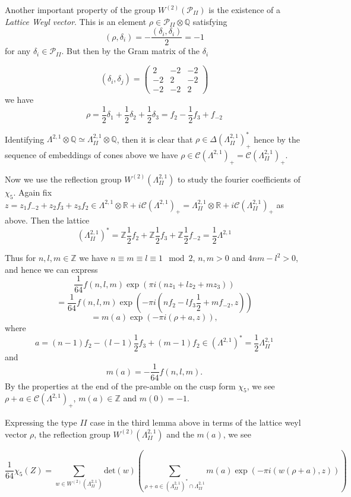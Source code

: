 \documentclass[9pt]{amsart} \usepackage[utf8]{inputenc}
\newcommand{\Q}{\mathbb{Q}}
\newcommand{\Z}{\mathbb{Z}} \newcommand{\C}{\mathbb{C}}
\newcommand{\R}{\mathbb{R}} \newcommand{\La}{\Lambda}
\newcommand{\Cone}{\mathcal{C}}
\newcommand{\Poly}{\mathcal{P}}
\begin{document}
Another important property of the group $W^{(2)}(\Poly_{II})$ is the
existence of a \textit{Lattice Weyl vector}. This is an element $\rho
\in \Poly_{II} \otimes \Q$ satisfying $$(\rho, \delta_i) =
-\frac{(\delta_i,\delta_i)}{2} = -1$$ for any $\delta_i \in \Poly_{II}.$
But then by the Gram matrix of the $\delta_i$

$$(\delta_i,\delta_j) = \begin{pmatrix}2 & -2 & -2\\-2 & 2 & -2\\-2 & -2
& 2\end{pmatrix}$$
we have $$\rho = \frac{1}{2}\delta_1 + \frac{1}{2}\delta_2 +
\frac{1}{2}\delta_3 = f_2 - \frac{1}{2}f_3 + f_{-2}$$

Identifying $\La^{2,1}\otimes \Q \simeq \La^{2,1}_{II} \otimes \Q$,
then it is clear that $\rho \in \Delta(\La^{2,1}_{II})_+^*$ hence
by the sequence of embeddings of cones above we have $\rho \in
\Cone(\La^{2,1})_+ = \Cone(\La^{2,1}_{II})_+$.

Now we use the reflection group $W^{(2)}(\La^{2,1}_{II})$ to study the
fourier coefficients of $\chi_5$. Again fix  $z = z_1 f_{-2} + z_2 f_3 +
z_3 f_2 \in \La^{2,1} \otimes \R + i\Cone(\La^{2,1})_+ = \La^{2,1}_{II}
\otimes \R + i\Cone(\La^{2,1}_{II})_+$ as above. Then the lattice
$$(\La^{2,1}_{II})^* = \Z \frac{1}{2} f_2 + \Z \frac{1}{2} f_3 + \Z
\frac{1}{2} f_{-2} = \frac{1}{2}\La^{2,1}$$

Thus for $n,l,m \in \Z$ we have $n \equiv m \equiv l \equiv 1 \mod 2$,
$n,m > 0$ and
$4nm - l^2 > 0$, and hence we can express $$\frac{1}{64}f(n,l,m)\exp(\pi i
(n z_1 + lz_2 + m z_3)) $$ $$= \frac{1}{64} f(n,l,m) \exp(- \pi i (nf_2 - l f_3
\frac{1}{2} + mf_{-2}, z))$$
$$= m(a) \exp (-\pi i(\rho +a, z)),$$
where $$a = (n-1) f_2 - (l-1)\frac{1}{2} f_3 + (m-1) f_2 \in (\La^{2,1})^*
= \frac{1}{2} \La^{2,1}_{II}$$ and $$m(a) = -\frac{1}{64} f(n,l,m).$$ By
the properties at the end of the pre-amble on the cusp form $\chi_5$, we
see $\rho + a \in \Cone(\La^{2,1})_+$, $m(a) \in \Z$ and $m(0) = -1$.

Expressing the type $II$ case in the third lemma above in terms of the
lattice weyl vector $\rho$, the reflection group
$W^{(2)}(\La^{2,1}_{II})$ and the $m(a)$, we see

$$\frac{1}{64} \chi_5(Z) = \displaystyle\sum_{w \in W^{(2)}(\La^{2,1}_{II})}
\text{det}(w) (
\displaystyle\sum_{\rho +a \in (\La^{2,1}_{II})^* \cap \La^{2,1}_{II}} m(a) \exp(-\pi
i(w(\rho +a), z) ))$$
\end{document}
